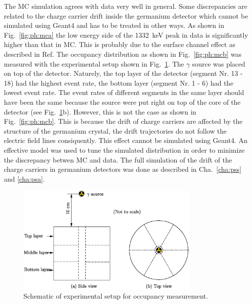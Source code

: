 The MC simulation agrees with data very well in general. Some discrepancies are related to the charge carrier drift inside the germanium detector which cannot be simulated using Geant4 and has to be treated in other ways. As shown in Fig.~\ref{fig:ph:mca} the low energy side of the 1332~keV peak in data is significantly higher than that in MC. This is probably due to the surface channel effect as described in Ref\cite{Sur05}. The occupancy distribution as shown in Fig.~\ref{fig:ph:mcb} was measured with the experimental setup shown in Fig.~\ref{fig:ph:occ}. The $\gamma$ source was placed on top of the detector. Naturely, the top layer of the detector (segment Nr. 13 - 18) had the highest event rate, the bottom layer (segment Nr. 1 - 6) had the lowest event rate. The event rates of different segments in the same layer should have been the same because the source were put right on top of the core of the detector (see Fig.~\ref{fig:ph:occ}b). However, this is not the case as shown in Fig.~\ref{fig:ph:mcb}. This is because the drift of charge carriers are affected by the structure of the germanium crystal, the drift trajectories do not follow the electric field lines consiquently. This effect cannot be simulated using Geant4. An effective model was used to tune the simulated distribution in order to minimize the discrepancy betwen MC and data. The full simulation of the drift of the charge carriers in germanium detectors was done as described in Cha.~\ref{cha:pss} and \ref{cha:psa}.

\begin{figure}[htbp]
\centering
\includegraphics[width=0.8\textwidth]{occumea}
\caption{Schematic of experimental setup for occupancy measurement.}
\label{fig:ph:occ}
\end{figure}

